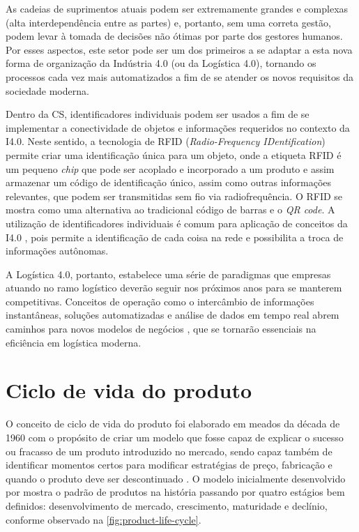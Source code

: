 As cadeias de suprimentos atuais podem ser extremamente grandes e complexas (alta interdependência entre as partes) e, portanto, sem uma correta gestão, podem levar à tomada de decisões não ótimas por parte dos gestores humanos. Por esses aspectos, este setor pode ser um dos primeiros a se adaptar a esta nova forma de organização da Indústria 4.0 (ou da Logística 4.0), tornando os processos cada vez mais automatizados a fim de se atender os novos requisitos da sociedade moderna.

Dentro da CS, identificadores individuais podem ser usados a fim de se implementar a conectividade de objetos e informações requeridos no contexto da I4.0. Neste sentido, a tecnologia de RFID (\textit{Radio-Frequency IDentification}) permite criar uma identificação única para um objeto, onde a etiqueta RFID é um pequeno \textit{chip} que pode ser acoplado e incorporado a um produto e assim armazenar um código de identificação único, assim como outras informações relevantes, que podem ser transmitidas sem fio via radiofrequência. O RFID se mostra como uma alternativa ao tradicional código de barras e o \textit{QR code}. A utilização de identificadores individuais é comum para aplicação de conceitos da I4.0 \cite{alyahya2016rfidwarehousing, vlachos2014rfidimpact, fan2015inventory, bibi2017rfidfood}, pois permite a identificação de cada coisa na rede e possibilita a troca de informações autônomas.

A Logística 4.0, portanto, estabelece uma série de paradigmas que empresas atuando no ramo logístico deverão seguir nos próximos anos para se manterem competitivas. Conceitos de operação como o intercâmbio de informações instantâneas, soluções automatizadas e análise de dados em tempo real abrem caminhos para novos modelos de negócios \cite{strandhagen2017logistics}, que se tornarão essenciais na eficiência em logística moderna.

\section{Ciclo de vida do produto}
\label{sec:ciclo-de-vida}

O conceito de ciclo de vida do produto foi elaborado em meados da década de 1960 com o propósito de criar um modelo que fosse capaz de explicar o sucesso ou fracasso de um produto introduzido no mercado, sendo capaz também de identificar momentos certos para modificar estratégias de preço, fabricação e quando o produto deve ser descontinuado \cite{cao2012lifecycle}. O modelo inicialmente desenvolvido por  mostra o padrão de produtos na história passando por quatro estágios bem definidos: desenvolvimento de mercado, crescimento, maturidade e declínio, conforme observado na \autoref{fig:product-life-cycle}.

